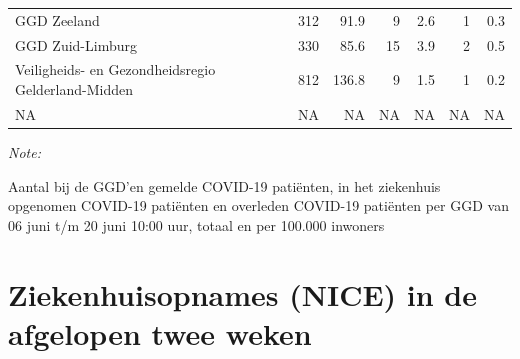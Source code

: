 \documentclass[
  english,
  man,floatsintext]{apa6}
\begin{document}
\begin{table}
\begin{threeparttable}
\begin{tabular}{lrrrrrr}
GGD Zeeland & 312 & 91.9 & 9 & 2.6 & 1 & 0.3\\
GGD Zuid-Limburg & 330 & 85.6 & 15 & 3.9 & 2 & 0.5\\
Veiligheids- en Gezondheidsregio Gelderland-Midden & 812 & 136.8 & 9 & 1.5 & 1 & 0.2\\
NA & NA & NA & NA & NA & NA & NA\\
\bottomrule
\end{tabular}
\begin{tablenotes}
\item \textit{Note: } 
\item Aantal bij de GGD’en gemelde COVID-19 patiënten, in het ziekenhuis opgenomen COVID-19 patiënten en overleden COVID-19 patiënten per GGD van 06 juni t/m 20 juni 10:00 uur, totaal en per 100.000 inwoners
\end{tablenotes}
\end{threeparttable}
\endgroup{}
\end{table}

\newpage

\hypertarget{ziekenhuisopnames-nice-in-de-afgelopen-twee-weken}{%
\section{Ziekenhuisopnames (NICE) in de afgelopen twee weken}\label{ziekenhuisopnames-nice-in-de-afgelopen-twee-weken}}
\end{document}
